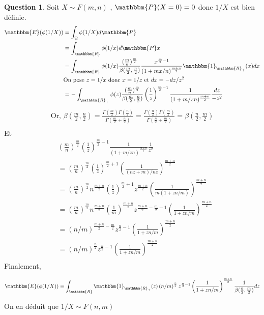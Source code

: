 \documentclass[12pt]{article}
\newcommand{\R}{\mathbbm{R}}
\newcommand{\1}{\mathbbm{1}}
\newcommand{\E}{\mathbbm{E}}
\newcommand{\Prob}{\mathbbm{P}}
\theoremstyle{definition}\newtheorem{defn}{Définition}
\theoremstyle{definition}\newtheorem{exm}{Exemple}
\theoremstyle{definition}\newtheorem{rem}{Remarque}
\theoremstyle{definition}\newtheorem{algo}{Algorithme}
\theoremstyle{remark}\newtheorem{exo}{Exercice}
\theoremstyle{remark}\newtheorem{nota}{Notation}
\theoremstyle{definition}\newtheorem{1q}{Question}
\theoremstyle{definition}\newtheorem{2q}{Question}
\theoremstyle{definition}\newtheorem{3q}{Question}
\theoremstyle{definition}\newtheorem{4q}{Question}
\theoremstyle{definition}\newtheorem{2qs1}{}
\theoremstyle{definition}\newtheorem{2qs2}{}
\theoremstyle{definition}\newtheorem{2qs3}{}
\theoremstyle{definition}\newtheorem{2qs4}{}
\theoremstyle{definition}\newtheorem{4qs2}{}
\theoremstyle{definition}\newtheorem{4qs3}{}
\begin{document}
\begin{3q}
Soit $X \sim F(m,n)$ , $\Prob(X=0)=0$ donc $1/X$ est bien définie.
\begin{align*}
\E(\phi(1/X)) &= \int_{\Omega}\phi(1/X)d\Prob \\
 &= \int_{\R}\phi(1/x)d\Prob x \\
 &= \displaystyle\int_\R \phi(1/x)\frac{(\frac{m}{n})^{\frac{m}{2}}}{\beta(\frac{m}{2}, \frac{n}{2})}\frac{x^{\frac{m}{2}-1}}{(1+mx/n)^{\frac{m+n}{2}}}\1_{\R_+}(x)dx\\
 &\text{On pose $z=1/x$ donc $x=1/z$ et $dx=-dz/z^2$}\\
 &= -\displaystyle\int_{\R_+}\phi(z)\frac{(\frac{m}{n})^{\frac{m}{2}}}{\beta(\frac{m}{2}, \frac{n}{2})}\left(\frac{1}{z}\right)^{\frac{m}{2} -1}\frac{1}{(1+m/zn)^{\frac{m+n}{2}}}\frac{dz}{-z^2}\\
 \end{align*} 
 \begin{align*}
 \text{Or, $\beta(\frac{m}{2}, \frac{n}{2}) = \displaystyle\frac{\Gamma(\frac{m}{2})\Gamma(\frac{n}{2})}{\Gamma(\frac{m}{2}+\frac{n}{2})} = \displaystyle\frac{\Gamma(\frac{n}{2})\Gamma(\frac{m}{2})}{\Gamma(\frac{n}{2}+\frac{m}{2})} = \beta(\frac{n}{2}, \frac{m}{2})$}\\
 \end{align*}
 Et
 \begin{align*}
 & (\frac{m}{n})^{\frac{m}{2}}\left(\frac{1}{z}\right)^{\frac{m}{2} -1}\frac{1}{(1+m/zn)^{\frac{m+n}{2}}}\frac{1}{z^2}\\
 &=(\frac{m}{n})^{\frac{m}{2}} \left(\frac{1}{z}\right)^{\frac{m}{2}+1}\left(\frac{1}{(nz+m)/nz}\right)^{\frac{m+n}{2}}\\
 &= (\frac{m}{n})^{\frac{m}{2}}n^{\frac{m+n}{2}} \left(\frac{1}{z}\right)^{\frac{m}{2}+1}z^{\frac{m+n}{2}}\left(\frac{1}{m(1+zn/m)}\right)^{\frac{m+n}{2}}\\
 &= (\frac{m}{n})^{\frac{m}{2}}n^{\frac{m+n}{2}} \left(\frac{1}{m}\right)^{\frac{m+n}{2}}z^{\frac{m+n}{2}-\frac{m}{2} -1}\left(\frac{1}{1+zn/m}\right)^{\frac{m+n}{2}}\\
 &= \left(n/m\right)^{\frac{m+n}{2}-\frac{m}{2}}z^{\frac{n}{2}-1}\left(\frac{1}{1+zn/m}\right)^{\frac{m+n}{2}}\\
 &= \left(n/m\right)^{\frac{n}{2}}z^{\frac{n}{2}-1}\left(\frac{1}{1+zn/m}\right)^{\frac{m+n}{2}}\\
\end{align*}
Finalement, 
\begin{center} $\E(\phi(1/X)) = \displaystyle\int_\R\1_{\R_+}(z)\left(n/m\right)^{\frac{n}{2}}z^{\frac{n}{2}-1}\left(\frac{1}{1+zn/m}\right)^{\frac{m+n}{2}}\frac{1}{\beta(\frac{n}{2},\frac{m}{2})}dz$\end{center}
On en déduit que $1/X \sim F(n,m)$
\end{3q}
\end{document}
